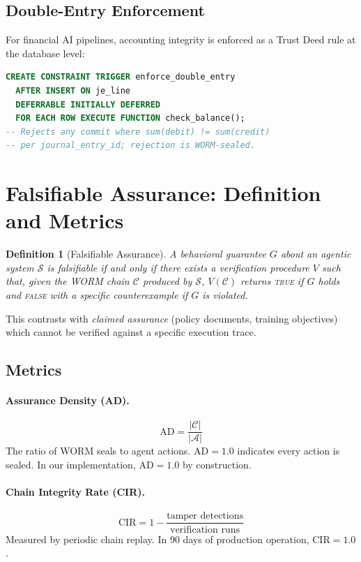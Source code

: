 \documentclass[12pt,letterpaper]{article}
\newtheorem{definition}{Definition}
\begin{document}
\subsection{Double-Entry Enforcement}

For financial AI pipelines, accounting integrity is enforced as a Trust Deed
rule at the database level:

\begin{lstlisting}[language=SQL, caption={Double-entry constraint trigger}]
CREATE CONSTRAINT TRIGGER enforce_double_entry
  AFTER INSERT ON je_line
  DEFERRABLE INITIALLY DEFERRED
  FOR EACH ROW EXECUTE FUNCTION check_balance();
-- Rejects any commit where sum(debit) != sum(credit)
-- per journal_entry_id; rejection is WORM-sealed.
\end{lstlisting}

\section{Falsifiable Assurance: Definition and Metrics}
\label{sec:metrics}

\begin{definition}[Falsifiable Assurance]
A behavioral guarantee $G$ about an agentic system $\mathcal{S}$ is
\emph{falsifiable} if and only if there exists a verification procedure $V$
such that, given the WORM chain $\mathcal{C}$ produced by $\mathcal{S}$,
$V(\mathcal{C})$ returns \textsc{true} if $G$ holds and \textsc{false} with
a specific counterexample if $G$ is violated.
\end{definition}

This contrasts with \emph{claimed assurance} (policy documents, training
objectives) which cannot be verified against a specific execution trace.

\subsection{Metrics}

\paragraph{Assurance Density (AD).}
\[
  \mathrm{AD} = \frac{|\mathcal{C}|}{|\mathcal{A}|}
\]
The ratio of WORM seals to agent actions. $\mathrm{AD} = 1.0$ indicates every
action is sealed. In our implementation, $\mathrm{AD} = 1.0$ by construction.

\paragraph{Chain Integrity Rate (CIR).}
\[
  \mathrm{CIR} = 1 - \frac{\text{tamper detections}}{\text{verification runs}}
\]
Measured by periodic chain replay. In 90 days of production operation, $\mathrm{CIR} = 1.0$.
\end{document}
